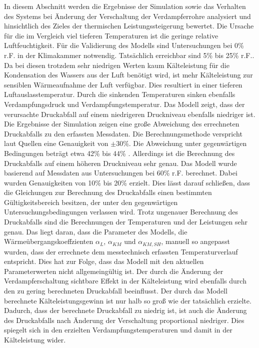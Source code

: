 In diesem Abschnitt werden die Ergebnisse der Simulation sowie das Verhalten des Systems bei Änderung der Verschaltung der Verdampferrohre analysiert und hinsichtlich des Zieles der thermischen Leistungssteigerung bewertet.
Die Ursache für die im Vergleich viel tieferen Temperaturen ist die geringe relative Luftfeuchtigkeit.
Für die Validierung des Modells sind Untersuchungen bei \unit{0}{\%} r.F. in der Klimakammer notwendig. Tatsächlich erreichbar sind \unit{5}{\%} bis \unit{25}{\%} r.F.. Da bei diesen trotzdem sehr niedrigen Werten kaum Kälteleistung für die Kondensation des Wassers aus der Luft benötigt wird, ist mehr Kälteleistung zur sensiblen Wärmeaufnahme der Luft verfügbar. Dies resultiert in einer tieferen Luftauslasstemperatur. Durch die sinkenden Temperaturen sinken ebenfalls Verdampfungsdruck und Verdampfungstemperatur. Das Modell zeigt, dass der verursachte Druckabfall auf einem niedrigeren Druckniveau ebenfalls niedriger ist. \newline
Die Ergebnisse der Simulation zeigen eine große Abweichung des errechneten Druckabfalls  zu den erfassten Messdaten. Die Berechnungsmethode verspricht laut Quellen eine Genauigkeit von $\pm 30 \%$. Die Abweichung unter gegenwärtigen Bedingungen beträgt etwa \unit{42}{\%} bis \unit{44}{\%} . Allerdings ist die Berechnung des Druckabfalls auf einem höheren Druckniveau sehr genau. Das Modell wurde basierend auf Messdaten aus Untersuchungen bei \unit{60}{\%} r.F. berechnet. Dabei wurden Genauigkeiten von \unit{10}{\%} bis \unit{20}{\%} erzielt. Dies lässt darauf schließen, dass die Gleichungen zur Berechnung des Druckabfalls einen bestimmten Gültigkeitsbereich besitzen, der unter den gegenwärtigen Untersuchungsbedingungen verlassen wird. \newline
Trotz ungenauer Berechnung des Druckabfalls sind die Berechnungen der Temperaturen und der Leistungen sehr genau. Das liegt daran, dass die Parameter des Modells, die Wärmeübergangskoeffzienten $\alpha_L$, $\alpha_{KM}$ und $\alpha_{KM,SH}$, manuell so angepasst wurden, dass der errechnete dem messtechnisch erfassten Temperaturverlauf entspricht. Dies hat zur Folge, dass das Modell mit den aktuellen Parameterwerten nicht allgemeingültig ist. \newline
Der durch die Änderung der Verdampferschaltung sichtbare Effekt in der Kälteleistung wird ebenfalls durch den zu gering berechneten Druckabfall beeinflusst. Der durch das Modell berechnete Kälteleistungsgewinn ist nur halb so groß wie der tatsächlich erzielte. Dadurch, dass der berechnete Druckabfall zu niedrig ist, ist auch die Änderung des Druckabfalls nach Änderung der Verschaltung proportional niedriger. Dies spiegelt sich in den erzielten Verdampfungstemperaturen und damit in der Kälteleistung wider.
